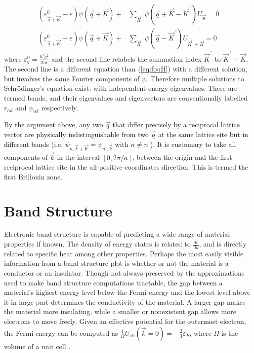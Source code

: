 \documentclass[12pt]{article}
\begin{document}
\begin{align*}
(\varepsilon_{\vec{q}+\vec{K}}^0-\varepsilon)\psi(\vec{q}+\vec{K}) + &\sum_{\vec{K}^{\, \prime}} \psi(\vec{q}+\vec{K}-\vec{K}^{\, \prime}) U_{\vec{K}} = 0 \\
(\varepsilon_{\vec{q}+\vec{K}}^0-\varepsilon)\psi(\vec{q}+\vec{K}) + &\sum_{\vec{K}^{\, \prime}} \psi(\vec{q}-\vec{K}^{\, \prime}) U_{\vec{K}^{\, \prime}+\vec{K}} = 0
\end{align*}
where $\varepsilon_q^0 = \frac{\hbar^2 q^2}{2m}$ and the second line relabels the summation index $\vec{K}^{\, \prime}$ to $\vec{K}^{\, \prime} - \vec{K}$. The second line is a different equation than (\ref{eq:fouH}) with a different solution, but involves the same Fourier components of $\psi$. Therefore multiple solutions to Schr\"{o}dinger's equation exist, with independent energy eigenvalues. These are termed bands, and their eigenvalues and eigenvectors are conventionally labelled $\varepsilon_{nk}$ and $\psi_{nk}$ respectively.
\par By the argument above, any two $\vec{q}$ that differ precisely by a reciprocal lattice vector are physically indistinguishable from two $\vec{q}$ at the same lattice site but in different bands (i.e. $\psi_{n,\vec{k} + \vec{K}} = \psi_{n^{\prime},\vec{k}}$ with $n \neq n^{\prime}$). It is customary to take all components of $\vec{k}$ in the interval $\left[ 0, 2\pi/a \right]$, between the origin and the first reciprocal lattice site in the all-positive-coordinates direction. This is termed the first Brillouin zone.


\section{Band Structure}
\par Electronic band structure is capable of predicting a wide range of material properties if known. The density of energy states is related to $\frac{d\varepsilon}{dk}$, and is directly related to specific heat among other properties. Perhaps the most easily visible information from a band structure plot is whether or not the material is a conductor or an insulator. Though not always preserved by the approximations used to make band structure computations tractable, the gap between a material's highest energy level below the Fermi energy and the lowest level above it in large part determines the conductivity of the material. A larger gap makes the material more insulating, while a smaller or nonexistent gap allows more electrons to move freely. Given an effective potential for the outermost electron, the Fermi energy can be computed as $\frac{1}{\Omega} U_{\textrm{eff}}(\vec{k}=0) = -\frac{2}{3} \varepsilon_F$, where $\Omega$ is the volume of a unit cell \cite{text}.
\end{document}
